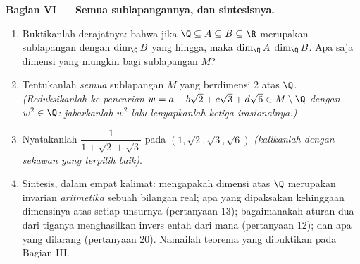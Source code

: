 \begin{problem}
\medskip
\noindent\textbf{Bagian VI --- Semua sublapangannya, dan sintesisnya.}
\begin{enumerate}[resume]
  \item Buktikanlah  derajatnya: bahwa jika $\Q \subseteq A
        \subseteq B \subseteq \R$ merupakan sublapangan dengan $\dim_\Q B$
        yang hingga, maka $\dim_\Q A$  $\dim_\Q B$. Apa saja
        dimensi yang mungkin bagi sublapangan $M$?
  \item Tentukanlah \emph{semua} sublapangan $M$ yang berdimensi $2$
        atas $\Q$. \emph{(Reduksikanlah ke pencarian $w = a + b\sqrt2
        + c\sqrt3 + d\sqrt6 \in M \setminus \Q$ dengan $w^2 \in
        \Q$: jabarkanlah $w^2$ lalu lenyapkanlah ketiga 
        irasionalnya.)}
  \item Nyatakanlah $\dfrac1{1 + \sqrt2 + \sqrt3}$ pada  $(1,
        \sqrt2, \sqrt3, \sqrt6)$ \emph{(kalikanlah dengan sekawan
        yang terpilih baik)}.
  \item Sintesis, dalam empat kalimat: mengapakah dimensi atas $\Q$ merupakan
        invarian \emph{aritmetika} sebuah  bilangan real; apa yang
        dipaksakan kehinggaan dimensinya atas setiap unsurnya
        (pertanyaan 13); bagaimanakah aturan dua dari tiganya menghasilkan
        invers entah dari mana (pertanyaan 12); dan apa yang
        dilarang  (pertanyaan 20). Namailah teorema yang dibuktikan
        pada Bagian III.

\end{enumerate}
\end{problem}
